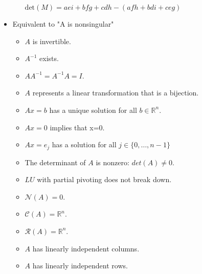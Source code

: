 \documentclass[a4paper]{article}
\begin{document}
\begin{itemize}
\begin{itemize}
                    \(\text{det}(M)= aei+bfg+cdh-(afh+bdi+ceg) \)
        	\end{itemize}
        \item Equivalent to "A is nonsingular"
        	\begin{itemize}
        		\item \(A\) is invertible.
                \item \(A^{-1}\) exists.
                \item \(AA^{-1}=A^{-1}A=I\).
                \item \(A\) represents a linear transformation that is a bijection.
                \item \(Ax=b\) has a unique solution for all \(b\in \mathbb{R} ^n\).
                \item \(Ax=0\) implies that x=0.
                \item \(Ax=e_j\) has a solution for all \(j\in \{0,\dots ,n-1\}\)
                \item The determinant of \(A\) is nonzero: \(det(A)\neq 0\).
                \item \(LU\) with partial pivoting does not break down.
                \item \(\mathcal{N}(A)={0}\).
                \item \(\mathcal{C}(A)=\mathbb{R}^n\).
                \item \(\mathcal{R}(A)=\mathbb{R}^n\).
                \item \(A\) has linearly independent columns.
                \item \(A\) has linearly independent rows.
        	\end{itemize}
	\end{itemize}
\end{document}
